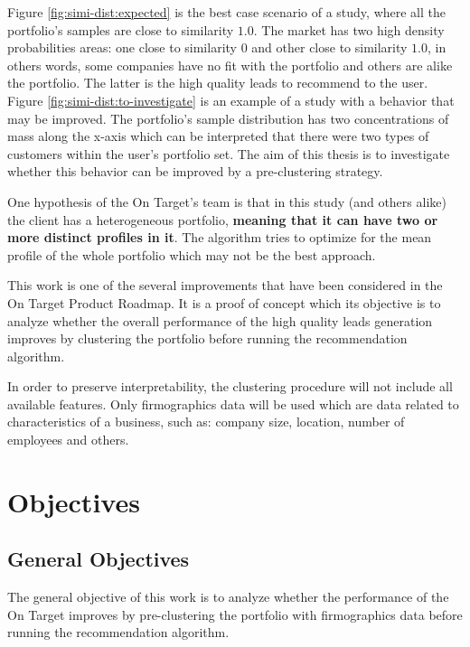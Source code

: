 Figure \ref{fig:simi-dist:expected} is the best case scenario of a study, where all the portfolio's samples are close to similarity $1.0$. The market has two high density probabilities areas: one close to similarity $0$ and other close to similarity $1.0$, in others words, some companies have no fit with the portfolio and others are alike the portfolio. The latter is the high quality leads to recommend to the user. Figure \ref{fig:simi-dist:to-investigate} is an example of a study with a behavior that may be improved. The portfolio's sample distribution has two concentrations of mass along the x-axis which can be interpreted that there were two types of customers within the user's portfolio set. The aim of this thesis is to investigate whether this behavior can be improved by a pre-clustering strategy.

One hypothesis of the On Target's team is that in this study (and others alike) the client has a heterogeneous portfolio, \textbf{meaning that it can have two or more distinct profiles in it}. The algorithm tries to optimize for the mean profile of the whole portfolio which may not be the best approach.

This work is one of the several improvements that have been considered in the On Target Product Roadmap. It is a proof of concept which its objective is to analyze whether the overall performance of the high quality leads generation improves by clustering the portfolio before running the recommendation algorithm. 

In order to preserve interpretability, the clustering procedure will not include all available features. Only firmographics data will be used \cite{weinstein2013handbook} which are data related to characteristics of a business, such as: company size, location, number of employees and others.


\section{Objectives}

\subsection{General Objectives}

The general objective of this work is to analyze whether the performance of the On Target improves by pre-clustering the portfolio with firmographics data before running the recommendation algorithm.

